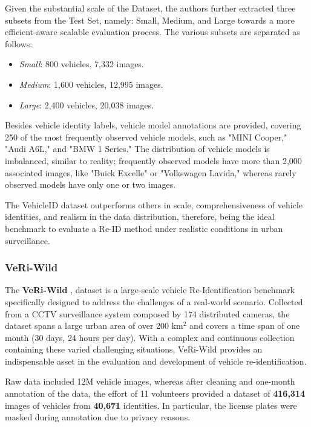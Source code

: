 Given the substantial scale of the Dataset, the authors further extracted three subsets from the Test Set, namely: Small, Medium, and Large towards a more efficient-aware scalable evaluation process. The various subsets are separated as follows:
\begin{itemize}
    \item \textit{Small}: 800 vehicles, 7,332 images.
    \item \textit{Medium}: 1,600 vehicles, 12,995 images.
    \item \textit{Large}: 2,400 vehicles, 20,038 images.
\end{itemize}

Besides vehicle identity labels, vehicle model annotations are provided, covering 250 of the most frequently observed vehicle models, such as "MINI Cooper," "Audi A6L," and "BMW 1 Series." The distribution of vehicle models is imbalanced, similar to reality; frequently observed models have more than 2,000 associated images, like "Buick Excelle" or "Volkswagen Lavida," whereas rarely observed models have only one or two images.

The VehicleID dataset outperforms others in scale, comprehensiveness of vehicle identities, and realism in the data distribution, therefore, being the ideal benchmark to evaluate a Re-ID method under realistic conditions in urban surveillance.

\subsubsection{VeRi-Wild}
The \textbf{VeRi-Wild} \cite{VeRi-Wild_1}, \cite{VeRi-Wild_2} dataset is a large-scale vehicle Re-Identification benchmark specifically designed to address the challenges of a real-world scenario. Collected from a CCTV surveillance system composed by 174 distributed cameras, the dataset spans a large urban area of over 200 km$^{2}$ and covers a time span of one month (30 days, 24 hours per day). With a complex and continuous collection containing these varied challenging situations, VeRi-Wild provides an indispensable asset in the evaluation and development of vehicle re-identification.

Raw data included 12M vehicle images, whereas after cleaning and one-month annotation of the data, the effort of 11 volunteers provided a dataset of \textbf{416,314} images of vehicles from \textbf{40,671} identities. In particular, the license plates were masked during annotation due to privacy reasons.


